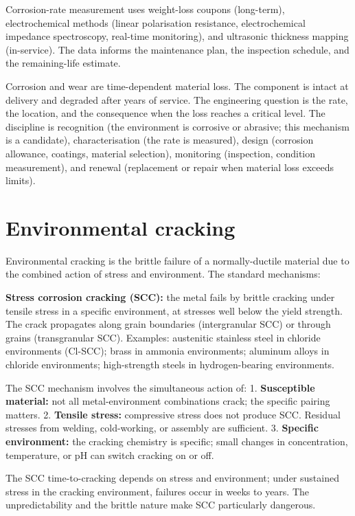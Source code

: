 Corrosion-rate measurement uses weight-loss coupons (long-term), electrochemical methods (linear polarisation resistance, electrochemical impedance spectroscopy, real-time monitoring), and ultrasonic thickness mapping (in-service). The data informs the maintenance plan, the inspection schedule, and the remaining-life estimate.

\begin{archetype}
Corrosion and wear are time-dependent material loss. The component is intact at delivery and degraded after years of service. The engineering question is the rate, the location, and the consequence when the loss reaches a critical level. The discipline is recognition (the environment is corrosive or abrasive; this mechanism is a candidate), characterisation (the rate is measured), design (corrosion allowance, coatings, material selection), monitoring (inspection, condition measurement), and renewal (replacement or repair when material loss exceeds limits).
\end{archetype}

\section{Environmental cracking}

Environmental cracking is the brittle failure of a normally-ductile material due to the combined action of stress and environment. The standard mechanisms:

\textbf{Stress corrosion cracking (SCC):} the metal fails by brittle cracking under tensile stress in a specific environment, at stresses well below the yield strength. The crack propagates along grain boundaries (intergranular SCC) or through grains (transgranular SCC). Examples: austenitic stainless steel in chloride environments (Cl-SCC); brass in ammonia environments; aluminum alloys in chloride environments; high-strength steels in hydrogen-bearing environments.

The SCC mechanism involves the simultaneous action of:
1. \textbf{Susceptible material:} not all metal-environment combinations crack; the specific pairing matters.
2. \textbf{Tensile stress:} compressive stress does not produce SCC. Residual stresses from welding, cold-working, or assembly are sufficient.
3. \textbf{Specific environment:} the cracking chemistry is specific; small changes in concentration, temperature, or pH can switch cracking on or off.

The SCC time-to-cracking depends on stress and environment; under sustained stress in the cracking environment, failures occur in weeks to years. The unpredictability and the brittle nature make SCC particularly dangerous.

